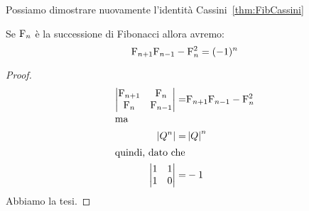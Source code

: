 Possiamo dimostrare nuovamente l'identità Cassini~\vref{thm:FibCassini}
\begin{thm}
	Se $\mathrm{F}_{n}$ è la successione di Fibonacci allora avremo:
\[\mathrm{F}_{n+1}\mathrm{F}_{n-1}-\mathrm{F}_{n}^2=(-1)^n\]
\end{thm}
\begin{proof}
\begin{align*}
\begin{vmatrix}
	\mathrm{F}_{n+1}&\mathrm{F}_{n}\\\mathrm{F}_{n}&\mathrm{F}_{n-1}
\end{vmatrix}=&\mathrm{F}_{n+1}\mathrm{F}_{n-1}-\mathrm{F}_{n}^2\\
\intertext{ma}
\left|Q^n\right|=&\left|Q\right|^n\\
\intertext{quindi, dato che}
\begin{vmatrix}
	1&1\\ 1&0\\
\end{vmatrix}=&-1
\end{align*}
Abbiamo la tesi.
\end{proof}
